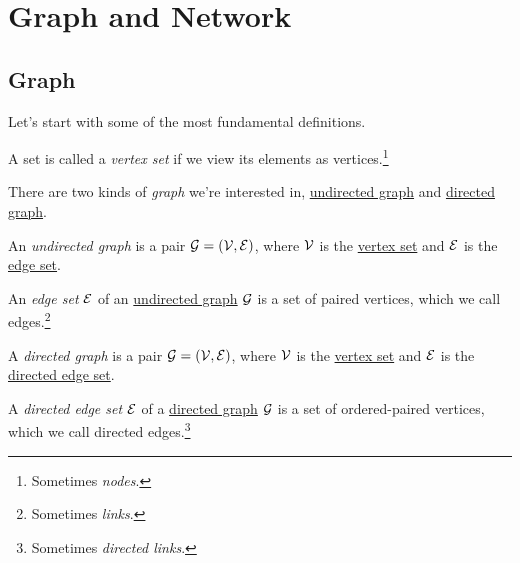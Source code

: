 \chapter{Graph and Network}
\section{Graph}
Let's start with some of the most fundamental definitions.

\begin{definition}\label{def:vertex-set}
	A set is called a \emph{vertex set} if we view its elements as vertices.\footnote{Sometimes \emph{nodes}.}
\end{definition}

\begin{definition}[Graph]\label{def:graph}
	There are two kinds of \emph{graph} we're interested in, \hyperref[def:undirected-graph]{undirected graph} and \hyperref[def:directed-graph]{directed graph}.
	\begin{definition}\label{def:undirected-graph}
		An \emph{undirected graph} is a pair \(\mathcal{G} = (\mathcal{\MakeUppercase{v}} , \mathcal{\MakeUppercase{e}} )\), where \(\mathcal{\MakeUppercase{v}} \) is
		the \hyperref[def:vertex-set]{vertex set} and \(\mathcal{\MakeUppercase{e}} \) is the \hyperref[def:edge-set]{edge set}.

		\begin{definition}\label{def:edge-set}
			An \emph{edge set} \(\mathcal{\MakeUppercase{e}} \) of an \hyperref[def:undirected-graph]{undirected graph} \(\mathcal{\MakeUppercase{g}} \) is a set of paired vertices, which we call edges.\footnote{Sometimes \emph{links}.}
		\end{definition}
	\end{definition}

	\begin{definition}\label{def:directed-graph}
		A \emph{directed graph} is a pair \(\mathcal{\MakeUppercase{g}} = (\mathcal{\MakeUppercase{v}}, \mathcal{\MakeUppercase{e}} )\), where \(\mathcal{\MakeUppercase{v}} \)
		is the \hyperref[def:vertex-set]{vertex set} and \(\mathcal{\MakeUppercase{e}} \) is the \hyperref[def:directed-edge-set]{directed edge set}.

		\begin{definition}\label{def:directed-edge-set}
			A \emph{directed edge set} \(\mathcal{\MakeUppercase{e}} \) of a \hyperref[def:directed-graph]{directed graph} \(\mathcal{\MakeUppercase{g}} \) is a set of ordered-paired vertices, which we call directed edges.\footnote{Sometimes \emph{directed links}.}
		\end{definition}
	\end{definition}
\end{definition}

